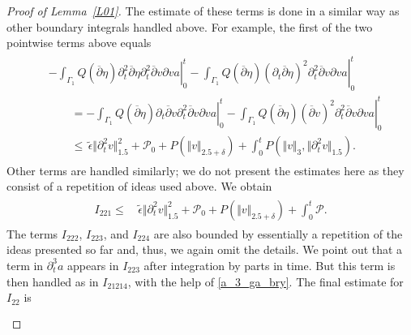\documentclass[10pt,reqno]{amsart}
\theoremstyle{plain}
\theoremstyle{definition}
\numberwithin{equation}{section}
\newcommand{\ccP}{\mathscr{P}}
\newcommand{\ccPz}{\mathscr{P}_0}
\newcommand{\Ga}{\Gamma}
\newcommand{\de}{\delta}
\newcommand{\norm}[1]{\Vert#1\Vert}
\def\indeq{\qquad{}}                     %
\begin{document}
\begin{proof}[Proof of Lemma~\ref{L01}]
The estimate of these terms is done in a similar way as other boundary
integrals handled above. %
For example,
the first of the two pointwise terms above equals
\begin{align}
\begin{split}
&
-\left.
\int_{\Ga_1} 
Q(\overline{\partial} \eta) \partial^2_t \overline{\partial} \eta 
\partial^2_t \overline{\partial} v {\partial} v a 
\right|_0^t
-\left.
\int_{\Ga_1} 
Q(\overline{\partial} \eta) (\partial_t \overline{\partial} \eta )^2
\partial^2_t \overline{\partial} v {\partial} v a 
\right|_0^t
\\
&
\indeq
= 
-\left.
\int_{\Ga_1} 
Q(\overline{\partial} \eta) \partial_t \overline{\partial} v
\partial^2_t \overline{\partial} v {\partial} v a 
\right|_0^t
-\left.
\int_{\Ga_1} 
Q(\overline{\partial} \eta) (\overline{\partial} v )^2
\partial^2_t \overline{\partial} v {\partial} v a 
\right|_0^t
\\
&
\indeq\leq 
\, 
\widetilde{\epsilon} \norm{\partial^2_t v }^2_{1.5} 
+\ccPz
+ P(\norm{v}_{2.5+\de})
+
\int_0^t 
P ( \norm{v}_3, \norm{\partial^2_t v}_{1.5} ).
\end{split}
\nonumber
\end{align}
Other terms
are handled similarly; we do not present
the estimates here as they consist of a repetition of ideas used above. We obtain
\begin{align}
\begin{split}
I_{221} \leq & \,
\widetilde{\epsilon} \norm{\partial^2_t v }^2_{1.5} 
+ 
\ccPz
+
P( \norm{v}_{2.5+\de})
+
\int_0^t \ccP.
\end{split}
\nonumber
\end{align}
The terms $I_{222}$, $I_{223}$, and $I_{224}$ are also bounded by essentially
a repetition of the ideas presented so far and, thus, we again omit the details. 
We point out that a term in $\partial^3_t a$ appears in $I_{223}$ after integration
by parts in time. But this term is then handled as in $I_{21214}$, with the help
of  \eqref{a_3_ga_bry}. The final estimate for $I_{22}$ is
\begin{align}
\begin{split}

\end{split}
\end{align}
\end{proof}
\end{document}
